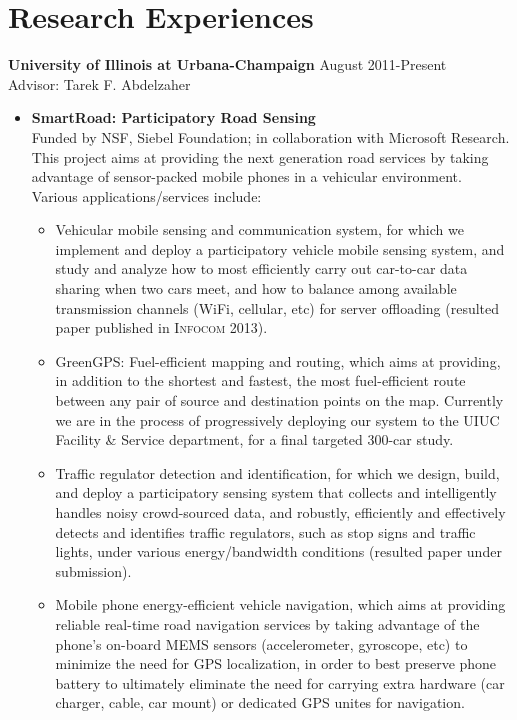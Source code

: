 \section{\sc Research Experiences}
{\bf University of Illinois at Urbana-Champaign} \hfill August 2011-Present\\
Advisor: Tarek F. Abdelzaher
\begin{itemize}
\item \textbf{SmartRoad: Participatory Road Sensing} \\ Funded by NSF,
  Siebel Foundation; in collaboration with Microsoft Research. This
  project aims at providing the next generation road services by
  taking advantage of sensor-packed mobile phones in a vehicular
  environment. Various applications/services include:
\begin{itemize}
\item Vehicular mobile sensing and communication system, for which we
  implement and deploy a participatory vehicle mobile sensing system,
  and study and analyze how to most efficiently carry out car-to-car
  data sharing when two cars meet, and how to balance among available
  transmission channels (WiFi, cellular, etc) for server offloading
  (resulted paper published in \textsc{Infocom 2013}).

\item GreenGPS: Fuel-efficient mapping and routing, which aims at
  providing, in addition to the shortest and fastest, the most
  fuel-efficient route between any pair of source and destination
  points on the map. Currently we are in the process of progressively
  deploying our system to the UIUC Facility \& Service department, for
  a final targeted 300-car study.

\item Traffic regulator detection and identification, for which we
  design, build, and deploy a participatory sensing system that
  collects and intelligently handles noisy crowd-sourced data, and
  robustly, efficiently and effectively detects and identifies traffic
  regulators, such as stop signs and traffic lights, under various
  energy/bandwidth conditions (resulted paper under submission).

\item Mobile phone energy-efficient vehicle navigation, which aims at
  providing reliable real-time road navigation services by taking
  advantage of the phone's on-board MEMS sensors (accelerometer,
  gyroscope, etc) to minimize the need for GPS localization, in order
  to best preserve phone battery to ultimately eliminate the need for
  carrying extra hardware (car charger, cable, car mount) or dedicated
  GPS unites for navigation.
\end{itemize}


\end{itemize}
